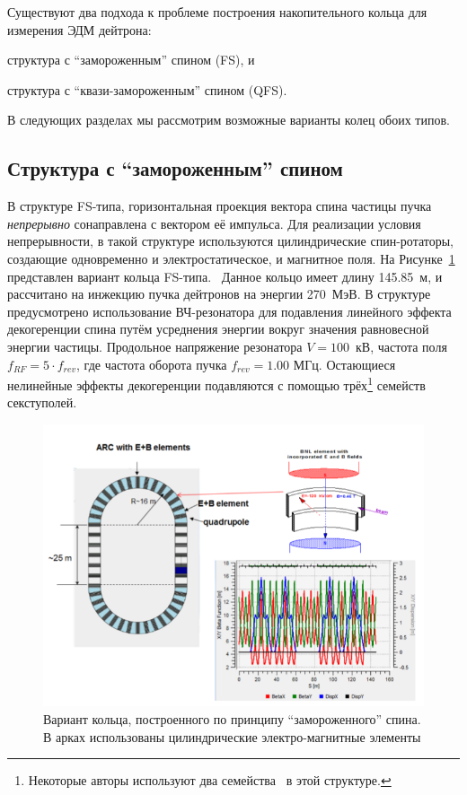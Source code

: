 
Существуют два подхода к проблеме построения накопительного кольца для измерения ЭДМ дейтрона: 
\begin{enumerate*}
	\item структура с ``замороженным'' спином (FS), и 
	\item структура с ``квази-замороженным'' спином (QFS).
\end{enumerate*}

В следующих разделах мы рассмотрим возможные варианты колец обоих типов.

\subsection{Структура с ``замороженным'' спином} \label{chpt2:lattice:FS_BNL}
В структуре FS-типа, горизонтальная проекция вектора спина частицы пучка \emph{непрерывно} сонаправлена с вектором её импульса. Для реализации условия непрерывности, в такой структуре используются цилиндрические спин-ротаторы, создающие одновременно и электростатическое, и магнитное поля. На Рисунке~\ref{fig:BNL_lattice} представлен вариант кольца FS-типа.~\cite{Senichev:Lattices} Данное кольцо имеет длину 145.85~м, и рассчитано на инжекцию пучка дейтронов на энергии 270~МэВ. В структуре предусмотрено использование ВЧ-резонатора для подавления линейного эффекта декогеренции спина путём усреднения энергии вокруг значения равновесной энергии частицы. Продольное напряжение резонатора $V = 100$~кВ, частота поля $f_{RF} = 5\cdot f_{rev}$, где частота оборота пучка $f_{rev} = 1.00$ МГц. Остающиеся нелинейные эффекты декогеренции подавляются с помощью трёх\footnote{Некоторые авторы используют
два семейства~\cite{Eremey:Thesis} в этой структуре.} семейств секступолей.

\begin{figure}[H]
	\centering
	\includegraphics[width=\linewidth]{images/chapter2/BNL_lattice}
	\caption{Вариант кольца, построенного по принципу ``замороженного'' спина. В арках использованы цилиндрические электро-магнитные элементы 
	\label{fig:BNL_lattice}}
\end{figure}

